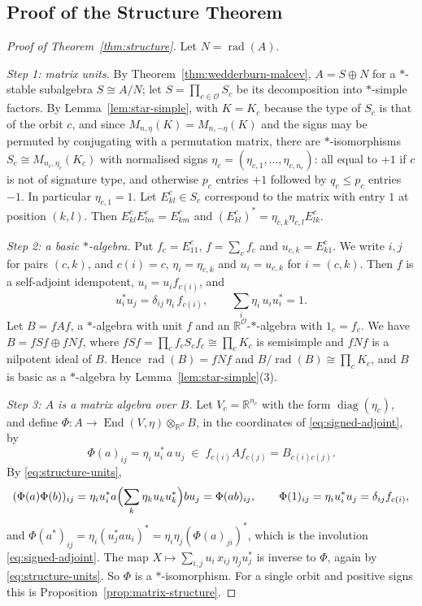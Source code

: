 \documentclass[12pt, a4paper]{report}
\theoremstyle{plain}
\theoremstyle{definition}
\theoremstyle{remark}
\theoremstyle{plain}
\newcommand{\rad}[0]{\operatorname{rad}} %
\newcommand{\RR}{\mathbb{R}}
\DeclareMathOperator{\End}{End}
\DeclareMathOperator{\diag}{diag}
\begin{document}
\subsection{Proof of the Structure Theorem}
\label{subsec:structure-proof}
\begin{proof}[Proof of Theorem~\ref{thm:structure}]
Let $N=\rad(A)$.

\emph{Step 1: matrix units.} By Theorem~\ref{thm:wedderburn-malcev}, $A=S\oplus N$ for a $*$-stable subalgebra $S\cong A/N$; let $S=\prod_{c\in\mathcal O}S_c$ be its decomposition into $*$-simple factors. By Lemma~\ref{lem:star-simple}, with $K=K_c$ because the type of $S_c$ is that of the orbit $c$, and since $M_{n,\eta}(K)=M_{n,-\eta}(K)$ and the signs may be permuted by conjugating with a permutation matrix, there are $*$-isomorphisms $S_c\cong M_{n_c,\eta_c}(K_c)$ with normalised signs $\eta_c=(\eta_{c,1},\dots,\eta_{c,n_c})$: all equal to $+1$ if $c$ is not of signature type, and otherwise $p_c$ entries $+1$ followed by $q_c\leq p_c$ entries $-1$. In particular $\eta_{c,1}=1$. Let $E^c_{kl}\in S_c$ correspond to the matrix with entry $1$ at position $(k,l)$. Then $E^c_{kl}E^c_{lm}=E^c_{km}$ and $(E^c_{kl})^*=\eta_{c,k}\eta_{c,l}E^c_{lk}$.

\emph{Step 2: a basic $*$-algebra.} Put $f_c=E^c_{11}$, $f=\sum_cf_c$ and $u_{c,k}=E^c_{k1}$. We write $i,j$ for pairs $(c,k)$, and $c(i)=c$, $\eta_i=\eta_{c,k}$ and $u_i=u_{c,k}$ for $i=(c,k)$. Then $f$ is a self-adjoint idempotent, $u_i=u_if_{c(i)}$, and
\begin{equation}\label{eq:structure-units}
  u_i^*u_j=\delta_{ij}\,\eta_i\,f_{c(i)},\qquad\sum_i\eta_i\,u_iu_i^*=1 .
\end{equation}
Let $B=fAf$, a $*$-algebra with unit $f$ and an $\RR^{\mathcal O}$-$*$-algebra with $1_c=f_c$. We have $B=fSf\oplus fNf$, where $fSf=\prod_cf_cS_cf_c\cong\prod_cK_c$ is semisimple and $fNf$ is a nilpotent ideal of $B$. Hence $\rad(B)=fNf$ and $B/\rad(B)\cong\prod_cK_c$, and $B$ is basic as a $*$-algebra by Lemma~\ref{lem:star-simple}(3).

\emph{Step 3: $A$ is a matrix algebra over $B$.} Let $V_c=\RR^{n_c}$ with the form $\diag(\eta_c)$, and define $\Phi:A\to\End(V,\eta)\otimes_{\RR^{\mathcal O}}B$, in the coordinates of \eqref{eq:signed-adjoint}, by
\[ \Phi(a)_{ij}=\eta_i\,u_i^*\,a\,u_j\;\in\;f_{c(i)}Af_{c(j)}=B_{c(i)c(j)} . \]
By \eqref{eq:structure-units},
\[ (\Phi(a)\Phi(b))_{ij}=\eta_iu_i^*a\Bigl(\sum_k\eta_ku_ku_k^*\Bigr)bu_j=\Phi(ab)_{ij},\qquad\Phi(1)_{ij}=\eta_iu_i^*u_j=\delta_{ij}f_{c(i)}, \]
and $\Phi(a^*)_{ij}=\eta_i(u_j^*au_i)^*=\eta_i\eta_j(\Phi(a)_{ji})^*$, which is the involution \eqref{eq:signed-adjoint}. The map $X\mapsto\sum_{i,j}u_i\,x_{ij}\,\eta_ju_j^*$ is inverse to $\Phi$, again by \eqref{eq:structure-units}. So $\Phi$ is a $*$-isomorphism. For a single orbit and positive signs this is Proposition~\ref{prop:matrix-structure}.


\end{proof}
\end{document}
